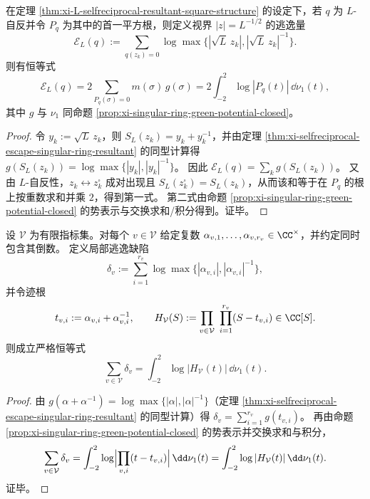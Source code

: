 \begin{corollary}\label{cor:xi-L-escape-green-energy-singular-ring}
在定理 \ref{thm:xi-L-selfreciprocal-resultant-square-structure} 的设定下，若 \(q\) 为 \(L\)-自反并令 \(P_q\) 为其中的首一平方根，则定义视界 \(|z|=L^{-1/2}\) 的逃逸量
\[
\mathcal{E}_L(q):=\sum_{q(z_k)=0}\log\max\{|\sqrt{L}\,z_k|,|\sqrt{L}\,z_k|^{-1}\}.
\]
则有恒等式
\[
\mathcal{E}_L(q)=2\sum_{P_q(\sigma)=0}m(\sigma)\,g(\sigma)
=2\int_{-2}^{2}\log|P_q(t)|\,\dd\nu_1(t),
\]
其中 \(g\) 与 \(\nu_1\) 同命题 \ref{prop:xi-singular-ring-green-potential-closed}。
\end{corollary}
\begin{proof}
令 \(y_k:=\sqrt{L}\,z_k\)，则 \(S_L(z_k)=y_k+y_k^{-1}\)，并由定理 \ref{thm:xi-selfreciprocal-escape-singular-ring-resultant} 的同型计算得
\(
g(S_L(z_k))=\log\max\{|y_k|,|y_k|^{-1}\}
\)。
因此 \(\mathcal{E}_L(q)=\sum_k g(S_L(z_k))\)。
又由 \(L\)-自反性，\(z_k\leftrightarrow z_k^\square\) 成对出现且 \(S_L(z_k^\square)=S_L(z_k)\)，从而该和等于在 \(P_q\) 的根上按重数求和并乘 \(2\)，得到第一式。
第二式由命题 \ref{prop:xi-singular-ring-green-potential-closed} 的势表示与交换求和/积分得到。证毕。
\end{proof}

\begin{proposition}\label{prop:xi-finite-euler-layer-local-global-singular-ring}
设 \(\mathcal{V}\) 为有限指标集。对每个 \(v\in\mathcal{V}\) 给定复数 \(\alpha_{v,1},\dots,\alpha_{v,r_v}\in\CC^\times\)，并约定同时包含其倒数。
定义局部逃逸缺陷
\[
\delta_v:=\sum_{i=1}^{r_v}\log\max\{|\alpha_{v,i}|,|\alpha_{v,i}|^{-1}\},
\]
并令迹根
\[
t_{v,i}:=\alpha_{v,i}+\alpha_{v,i}^{-1},
\qquad
H_{\mathcal{V}}(S):=\prod_{v\in\mathcal{V}}\ \prod_{i=1}^{r_v}(S-t_{v,i})\in\CC[S].
\]
则成立严格恒等式
\[
\sum_{v\in\mathcal{V}}\delta_v=\int_{-2}^{2}\log|H_{\mathcal{V}}(t)|\,\dd\nu_1(t).
\]
\end{proposition}
\begin{proof}
由 \(g(\alpha+\alpha^{-1})=\log\max\{|\alpha|,|\alpha|^{-1}\}\)（定理 \ref{thm:xi-selfreciprocal-escape-singular-ring-resultant} 的同型计算）得
\(
\delta_v=\sum_{i=1}^{r_v} g(t_{v,i})
\)。
再由命题 \ref{prop:xi-singular-ring-green-potential-closed} 的势表示并交换求和与积分，
\[
\sum_{v\in\mathcal{V}}\delta_v
=\int_{-2}^{2}\log\Bigl|\prod_{v,i}(t-t_{v,i})\Bigr|\,\dd\nu_1(t)
=\int_{-2}^{2}\log|H_{\mathcal{V}}(t)|\,\dd\nu_1(t).
\]
证毕。
\end{proof}

